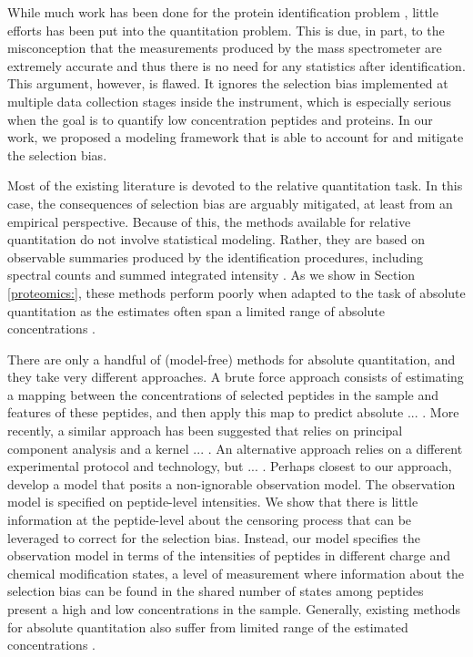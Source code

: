 While much work has been done for the protein identification problem \citep{}, little efforts has been put into the quantitation problem. 
This is due, in part, to the misconception that the measurements produced by the mass spectrometer are extremely accurate and thus there is no need for any statistics after identification. This argument, however, is flawed. It ignores the selection bias implemented at multiple data collection stages inside the instrument, which is especially serious when the goal is to quantify low concentration peptides and proteins. In our work, we proposed a modeling framework that is able to account for and mitigate the selection bias. 

Most of the existing literature is devoted to the relative quantitation task. In this case, the consequences of selection bias are arguably mitigated, at least from an empirical perspective. Because of this, the methods available for relative quantitation do not involve statistical modeling. Rather, they are based on observable summaries produced by the identification procedures, including spectral counts and summed integrated intensity \citep{}. As we show in Section \ref{proteomics:}, these methods perform poorly when adapted to the task of absolute quantitation as the estimates often span a limited range of absolute concentrations \citep{Schulze:2010fk}.

There are only a handful of (model-free) methods for absolute quantitation, and they take very different approaches.
 A brute force approach consists of estimating a mapping between the concentrations of selected peptides in the sample and features of these peptides, and then apply this map to predict absolute ... \citep{Lu:2006p10143}. 
 More recently, a similar approach has been suggested that relies on principal component analysis and a kernel ... \citep{Dicker:2010ea}.
 An alternative approach relies on a different experimental protocol and technology, but ... \citep{Luo:2009ff}.
 Perhaps closest to our approach, \citet{Karpievitch:2009wb} develop a model that posits a non-ignorable observation model. The observation model is specified on peptide-level intensities. We show that there is little information at the peptide-level about the censoring process that can be leveraged to correct for the selection bias. Instead, our model specifies the observation model in terms of the intensities of peptides in different charge and chemical modification states, a level of measurement where  information about the selection bias can be found in the shared number of states among peptides present a high and low concentrations in the sample. 
Generally, existing methods for absolute quantitation also suffer from limited range of the estimated concentrations \citep{Schulze:2010fk}.


